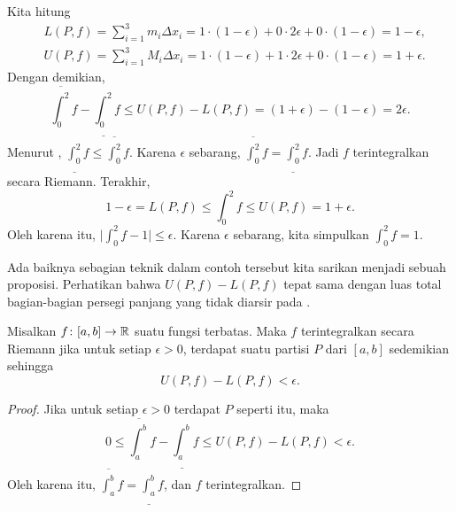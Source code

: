 \begin{example}
Kita hitung
\begin{align*}
& L(P,f) = \sum_{i=1}^3 m_i \Delta x_i =
1 \cdot (1-\epsilon) + 0 \cdot 2\epsilon + 0 \cdot (1-\epsilon)
= 1-\epsilon , \\
& U(P,f) = \sum_{i=1}^3 M_i \Delta x_i =
1 \cdot (1-\epsilon) + 1 \cdot 2\epsilon + 0 \cdot (1-\epsilon)
= 1+\epsilon .
\end{align*}
Dengan demikian,
\begin{equation*}
\overline{\int_0^2} f - 
\underline{\int_0^2} f
\leq
U(P,f) - L(P,f)
=
(1+\epsilon)
- (1-\epsilon) = 2 \epsilon .
\end{equation*}
Menurut , $\underline{\int_0^2} f \leq \overline{\int_0^2} f$.
Karena $\epsilon$ sebarang,
$\overline{\int_0^2} f = \underline{\int_0^2} f$.  Jadi $f$ terintegralkan secara
Riemann.  Terakhir,
\begin{equation*}
1-\epsilon = L(P,f) \leq \int_0^2 f \leq U(P,f) =
1+\epsilon.
\end{equation*}
Oleh karena itu, $\bigl\lvert \int_0^2 f - 1 \bigr\rvert \leq \epsilon$.  Karena $\epsilon$ sebarang,
kita simpulkan $\int_0^2 f = 1$.
\end{example}

Ada baiknya sebagian teknik dalam contoh tersebut kita sarikan menjadi sebuah
proposisi.  Perhatikan bahwa $U(P,f)-L(P,f)$ tepat sama dengan luas total bagian-bagian
persegi panjang yang tidak diarsir pada .

\begin{prop}
Misalkan $f \colon [a,b] \to {\mathbb{R}}$ suatu fungsi terbatas.  Maka $f$ terintegralkan secara
Riemann jika untuk setiap $\epsilon > 0$, terdapat suatu partisi $P$ dari
$[a,b]$ sedemikian sehingga
\begin{equation*}
U(P,f) - L(P,f) < \epsilon .
\end{equation*}
\end{prop}

\begin{proof}
Jika untuk setiap $\epsilon > 0$ terdapat $P$ seperti itu, maka
\begin{equation*}
0 \leq
\overline{\int_a^b} f - 
\underline{\int_a^b} f
\leq
U(P,f) - L(P,f) < \epsilon .
\end{equation*}
Oleh karena itu, 
$\overline{\int_a^b} f = \underline{\int_a^b} f$, dan $f$ terintegralkan.
\end{proof}


